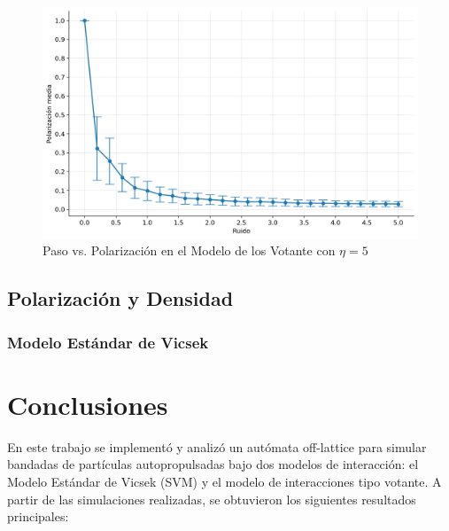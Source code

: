\documentclass{article}
\begin{document}
\begin{figure} [H]
    \centering
    \includegraphics[width=1\linewidth]{mean-last1000-vs-noise-voters.png}
    \caption{Paso vs. Polarización en el Modelo de los Votante con \(\eta =5\)}
    \label{fig:8}
\end{figure}

\subsection{Polarización y Densidad}
\subsubsection{Modelo Estándar de Vicsek}



\section{Conclusiones}

En este trabajo se implementó y analizó un autómata off-lattice para simular bandadas de partículas autopropulsadas bajo dos modelos de interacción: el Modelo Estándar de Vicsek (SVM) y el modelo de interacciones tipo votante. A partir de las simulaciones realizadas, se obtuvieron los siguientes resultados principales:
\end{document}
